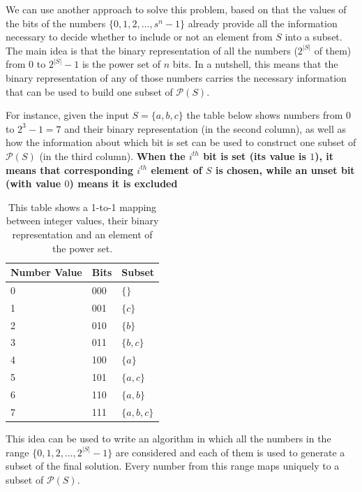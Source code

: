 We can use another approach to solve this problem, based on that the values of the
bits of the numbers $\{0,1,2,\ldots, s^n-1\}$  already provide all the information necessary to decide whether to include or not an element from $S$ into a subset. 
The main idea is that the binary representation of all the numbers ($2^{|S|}$ of them) from $0$ to $2^{|S|}-1$ is the power set of $n$ bits.
In a nutshell, this means that the binary representation of any of those numbers carries the necessary information that can be used to build one subset of $\mathcal{P}(S)$. 


For instance, given the input $S=\{a,b,c\}$ the table below shows numbers from $0$ to $2^3-1 = 7$ and their binary
representation (in the second column), as well as how the information about which bit is set can be used to construct one subset of $\mathcal{P}(S)$ (in the third column).
\textbf{When the $i^{th}$ bit is set (its value is $1$), it means that
corresponding $i^{th}$ element of $S$ is chosen, while an unset bit (with value $0$) means it is
excluded}

\begin{table}
    \centering
    \begin{tabular}{|l|l|l|}
        \hline
        Number Value & Bits & Subset\\ \hline
        0     & 000  & $\{\}$\\ \hline
        1     & 001  & $\{c\}$\\ \hline
        2     & 010  & $\{b\}$\\ \hline
        3     & 011  & $\{b,c\}$\\ \hline
        4     & 100  & $\{a\}$\\ \hline
        5     & 101  & $\{a,c\}$\\ \hline
        6     & 110  & $\{a,b\}$\\ \hline
        7     & 111  & $\{a,b,c\}$ \\ \hline
    \end{tabular}
    \caption[Mapping between bits and element of the power set.]{This table shows a 1-to-1 mapping between integer values, their binary representation and an element of the power set.}
    \label{tab:mapping_value_bits}
\end{table}


This idea can be used to write an algorithm in which all the numbers in the range $\{0,1,2,\ldots,
2^{|S|}-1\}$ are considered and each of them is used to generate a subset of the final solution.
Every number from this range maps uniquely to a subset of $\mathcal{P}(S)$. 

